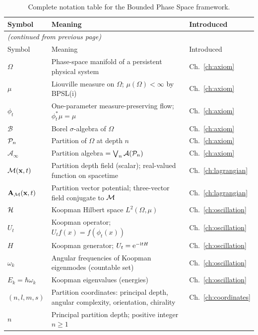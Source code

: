 \begin{longtable}{@{}lp{9cm}l@{}}
\caption{Complete notation table for the Bounded Phase Space framework.}
\label{tab:notation}\\
\toprule
Symbol & Meaning & Introduced \\
\midrule
\endfirsthead
\multicolumn{3}{l}{\small\itshape (continued from previous page)}\\
\toprule
Symbol & Meaning & Introduced \\
\midrule
\endhead
\bottomrule
\endfoot
$\Omega$ & Phase-space manifold of a persistent physical system &
  Ch.~\ref{ch:axiom} \\
$\mu$ & Liouville measure on $\Omega$; $\mu(\Omega)<\infty$ by BPSL(i) &
  Ch.~\ref{ch:axiom} \\
$\phi_{t}$ & One-parameter measure-preserving flow;
  $\phi_{t}^{*}\mu=\mu$ & Ch.~\ref{ch:axiom} \\
$\mathcal{B}$ & Borel $\sigma$-algebra of $\Omega$ & Ch.~\ref{ch:axiom} \\
$\mathcal{P}_{n}$ & Partition of $\Omega$ at depth $n$ &
  Ch.~\ref{ch:axiom} \\
$\mathcal{A}_{\infty}$ & Partition algebra
  $=\bigvee_{n}\mathcal{A}(\mathcal{P}_{n})$ & Ch.~\ref{ch:axiom} \\
$\mathcal{M}(\mathbf{x},t)$ & Partition depth field (scalar); real-valued
  function on spacetime & Ch.~\ref{ch:lagrangian} \\
$\mathbf{A}_{\mathcal{M}}(\mathbf{x},t)$ & Partition vector potential; three-vector
  field conjugate to $\mathcal{M}$ & Ch.~\ref{ch:lagrangian} \\
$\mathcal{H}$ & Koopman Hilbert space $L^{2}(\Omega,\mu)$ &
  Ch.~\ref{ch:oscillation} \\
$U_{t}$ & Koopman operator; $U_{t}f(x)=f(\phi_{t}(x))$ &
  Ch.~\ref{ch:oscillation} \\
$H$ & Koopman generator; $U_{t}=\mathrm{e}^{-\mathrm{i} tH}$ &
  Ch.~\ref{ch:oscillation} \\
$\omega_{k}$ & Angular frequencies of Koopman eigenmodes (countable set) &
  Ch.~\ref{ch:oscillation} \\
$E_{k}=\hbar\omega_{k}$ & Koopman eigenvalues (energies) &
  Ch.~\ref{ch:oscillation} \\
$(n,l,m,s)$ & Partition coordinates: principal depth, angular complexity,
  orientation, chirality & Ch.~\ref{ch:coordinates} \\
$n$ & Principal partition depth; positive integer $n\geq 1$ &

\end{longtable}
